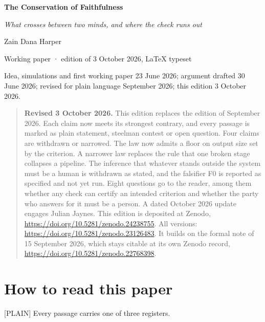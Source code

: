 \documentclass[11pt]{article}
\newcommand{\register}[1]{{\ttfamily\small #1}}
\begin{document}
\begin{center}
{\LARGE\bfseries The Conservation of Faithfulness\par}
\medskip
{\large\emph{What crosses between two minds, and where the check runs out}\par}
\medskip
Zain Dana Harper\par
{\small Working paper · edition of 3 October 2026, LaTeX typeset\par}
{\small Idea, simulations and first working paper 23 June 2026; argument drafted 30 June 2026; revised for plain language September 2026; this edition 3 October 2026.\par}
\end{center}

\begin{quote}\small
\textbf{Revised 3 October 2026.} This edition replaces the edition of September 2026. Each claim now meets its strongest contrary, and every passage is marked as plain statement, steelman contest or open question. Four claims are withdrawn or narrowed. The law now admits a floor on output size set by the criterion. A narrower law replaces the rule that one broken stage collapses a pipeline. The inference that whatever stands outside the system must be a human is withdrawn as stated, and the falsifier F0 is reported as specified and not yet run. Eight questions go to the reader, among them whether any check can certify an intended criterion and whether the party who answers for it must be a person. A dated October 2026 update engages Julian Jaynes. This edition is deposited at Zenodo, \url{https://doi.org/10.5281/zenodo.24238755}. All versions: \url{https://doi.org/10.5281/zenodo.23126483}. It builds on the formal note of 15 September 2026, which stays citable at its own Zenodo record, \url{https://doi.org/10.5281/zenodo.22768398}.
\end{quote}
\section*{How to read this paper}

\register{[PLAIN]} Every passage carries one of three registers.
\end{document}
